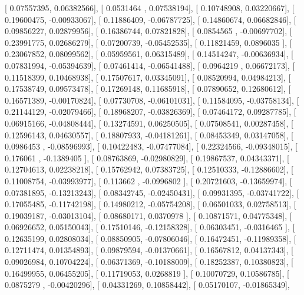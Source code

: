 \documentclass{article}
\begin{document}
       [ 0.07557395,  0.06382566],
       [ 0.0531464 ,  0.07538194],
       [ 0.10748908,  0.03220667],
       [ 0.19600475, -0.00933067],
       [ 0.11886409, -0.06787725],
       [ 0.14860674,  0.06682846],
       [ 0.09856227,  0.02879956],
       [ 0.16386744,  0.07821828],
       [ 0.0854565 , -0.00697702],
       [ 0.23991775,  0.02686279],
       [ 0.07200739, -0.05452535],
       [ 0.11821459,  0.0896035 ],
       [ 0.23067852,  0.08099562],
       [ 0.05959561,  0.06315489],
       [ 0.14514247, -0.00636934],
       [ 0.07831994, -0.05394639],
       [ 0.07461414, -0.06541488],
       [ 0.0964219 ,  0.06672173],
       [ 0.11518399,  0.10468938],
       [ 0.17507617,  0.03345091],
       [ 0.08520994,  0.04984213],
       [ 0.17538749,  0.09573478],
       [ 0.17269148,  0.11685918],
       [ 0.07890652,  0.12680612],
       [ 0.16571389, -0.00170824],
       [ 0.07730708, -0.06101031],
       [ 0.11584095, -0.03758134],
       [ 0.21144129, -0.02079466],
       [ 0.18968207, -0.03826369],
       [ 0.07464172,  0.09287785],
       [ 0.06915166, -0.04808444],
       [ 0.13274591,  0.06250505],
       [ 0.07508541,  0.00287458],
       [ 0.12596143,  0.04630557],
       [ 0.18807933, -0.04181261],
       [ 0.08453349,  0.03147058],
       [ 0.0986453 , -0.08596993],
       [ 0.10422483, -0.07477084],
       [ 0.22324566, -0.09348015],
       [ 0.176061  , -0.1389405 ],
       [ 0.08763869, -0.02980829],
       [ 0.19867537,  0.04343371],
       [ 0.12704613,  0.02238218],
       [ 0.15762942,  0.07383725],
       [ 0.12510333, -0.12886602],
       [ 0.11008754, -0.03993977],
       [ 0.113662  , -0.0996802 ],
       [ 0.20721603, -0.13659974],
       [ 0.07381895, -0.13213243],
       [ 0.08342745, -0.02450431],
       [ 0.09931395, -0.03741722],
       [ 0.17055485, -0.11742198],
       [ 0.14980212, -0.05754208],
       [ 0.06501033,  0.02758513],
       [ 0.19039187, -0.03013104],
       [ 0.08680171,  0.0370978 ],
       [ 0.10871571,  0.04775348],
       [ 0.06926652,  0.05150043],
       [ 0.17510146, -0.12158328],
       [ 0.06303451, -0.0316465 ],
       [ 0.12635199,  0.02808034],
       [ 0.08850905, -0.07806046],
       [ 0.16472451, -0.11989358],
       [ 0.12711474,  0.01354893],
       [ 0.09879594, -0.01370661],
       [ 0.16567812,  0.04137343],
       [ 0.09026984,  0.10704224],
       [ 0.06371369, -0.10188009],
       [ 0.18252387,  0.10380823],
       [ 0.16499955,  0.06455205],
       [ 0.11719053,  0.0268819 ],
       [ 0.10070729,  0.10586785],
       [ 0.0875279 , -0.00420296],
       [ 0.04331269,  0.10858442],
       [ 0.05170107, -0.01865349],
\end{document}

